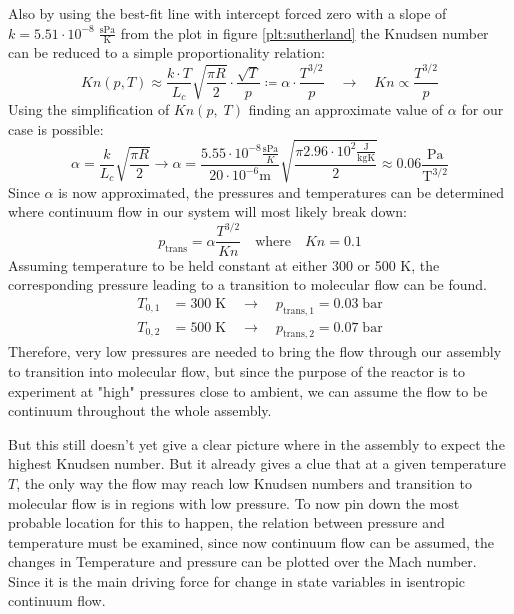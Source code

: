 	Also by using the best-fit line with intercept forced zero with a slope of $k = 5.51 \cdot 10^{-8} \; \frac{\text{sPa}}{\text{K}}$ from the plot in figure \ref{plt:sutherland} the Knudsen number can be reduced to a simple proportionality relation:
	\begin{equation}
		Kn(p,T) \approx
		\frac{ k \cdot T }{ L_c } \sqrt{ \frac{ \pi R}{ 2 } } \cdot \frac{ \sqrt{ T }}{ p }
		\coloneqq \alpha \cdot \frac{ T^{ 3/2 } }{ p }
		\quad \rightarrow \quad
		Kn \propto \frac{ T^{ 3/2 } }{ p }
	\end{equation}
	Using the simplification of $Kn(p,\;T)$ finding an approximate value of $\alpha$ for our case is possible:
	$$
		\alpha = \frac{k}{L_c}\sqrt{\frac{\pi R}{2}}
		\to \alpha = \frac{5.55\cdot 10^{-8} \frac{\text{sPa}}{K}}{20\cdot10^{-6}\text{m}}\sqrt{\frac{\pi 2.96\cdot 10^{2} \frac{\text{J}}{\text{kgK}}}{2}}
		\approx 0.06 \frac{\text{Pa}}{\text{T}^{3/2}}
	$$
	Since $\alpha$ is now approximated, the pressures and temperatures can be determined where continuum flow in our system will most likely break down:
	$$
		p_\text{trans} = \alpha \frac{T^{3/2}}{Kn} \quad \text{where} \quad Kn = 0.1
	$$
	Assuming temperature to be held constant at either 300 or 500 K, the corresponding pressure leading to a transition to molecular flow can be found.
	\begin{align*}
		T_{0,1} &= 300\;\text{K} \quad \to \quad p_{\text{trans},1} = 0.03\;\text{bar}\\
		T_{0,2} &= 500\;\text{K} \quad \to \quad p_{\text{trans},2} = 0.07\;\text{bar}
 	\end{align*}
	Therefore, very low pressures are needed to bring the flow through our assembly to transition into molecular flow, but since the purpose of the reactor is to experiment at "high" pressures close to ambient, we can assume the flow to be continuum throughout the whole assembly.
	
	But this still doesn't yet give a clear picture where in the assembly to expect the highest Knudsen number.
	But it already gives a clue that at a given temperature $T$, the only way the flow may reach low Knudsen numbers and transition to molecular flow is in regions with low pressure.
	To now pin down the most probable location for this to happen, the relation between pressure and temperature must be examined, since now continuum flow can be assumed, the changes in Temperature and pressure can be plotted over the Mach number.
	Since it is the main driving force for change in state variables in isentropic continuum flow.

